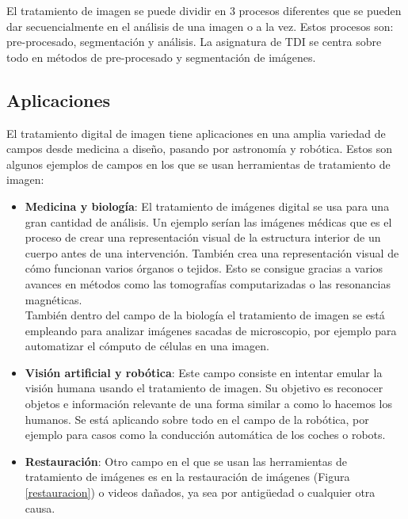 El tratamiento de imagen se puede dividir en 3 procesos diferentes que se pueden dar secuencialmente en el análisis de una imagen o a la vez. Estos procesos son: pre-procesado, segmentación y análisis. La asignatura de TDI se centra sobre todo en métodos de pre-procesado y segmentación de imágenes.\\ 

\subsection{Aplicaciones}
El tratamiento digital de imagen tiene aplicaciones en una amplia variedad de campos desde medicina a diseño, pasando por astronomía y robótica\cite{Usos}.  Estos son algunos ejemplos de campos en los que se usan herramientas de tratamiento de imagen:
\begin{itemize}
\item \textbf{Medicina y biología}: El tratamiento de imágenes digital se usa para una gran cantidad de análisis. Un ejemplo serían las imágenes médicas que es el proceso de crear una representación visual de la estructura interior de un cuerpo antes de una intervención. También crea una representación visual de cómo funcionan varios órganos o tejidos. Esto se consigue gracias a varios avances en métodos como las tomografías computarizadas o las resonancias magnéticas.\\

También dentro del campo de la biología el tratamiento de imagen se está empleando para analizar imágenes sacadas de microscopio, por ejemplo para automatizar el cómputo de células en una imagen.\\

\item \textbf{Visión artificial y robótica}: Este campo consiste en intentar emular la visión humana usando el tratamiento de imagen. Su objetivo es reconocer objetos e información relevante de una forma similar a como lo hacemos los humanos. Se está aplicando sobre todo en el campo de la robótica, por ejemplo para casos como la conducción automática de los coches o robots.\\

\item \textbf{Restauración}: Otro campo en el que se usan las herramientas de tratamiento de imágenes es en la restauración de imágenes (Figura \ref{restauracion}) o videos dañados, ya sea por antigüedad o cualquier otra causa. \\


\end{itemize}
